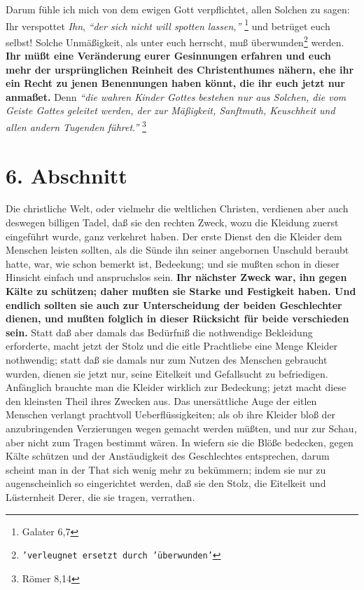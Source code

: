 \medskip

Darum fühle ich mich von dem ewigen Gott verpflichtet, allen Solchen zu sagen:
Ihr verspottet \textit{Ihn},
\textit{"`der sich nicht will spotten lassen,"'}
\footnote{Galater 6,7}
und betrüget euch selbst! Solche Unmäßigkeit, als unter euch herrscht, muß
überwunden\footnote{\texttt{'verleugnet ersetzt durch 'überwunden'}} werden.
\label{ref:14_06_wahre_nachfolger_umkehr}
\textbf{Ihr müßt eine Veränderung eurer Gesinnungen erfahren und euch
mehr der ursprünglichen Reinheit des Christenthumes nähern, ehe ihr ein Recht zu
jenen Benennungen haben könnt, die ihr euch jetzt nur anmaßet.}  Denn
\textit{"`die wahren
Kinder Gottes bestehen nur aus Solchen, die vom Geiste Gottes geleitet werden,
der zur Mäßigkeit, Sanftmuth, Keuschheit und allen andern Tugenden
führet."'}
\footnote{Römer 8,14}

\section{6. Abschnitt} \label{kap14_ab6}

Die christliche Welt, oder vielmehr die weltlichen Christen, verdienen aber auch
deswegen billigen Tadel, daß sie den rechten Zweck, wozu die Kleidung zuerst
eingeführt wurde, ganz verkehret haben. Der erste Dienst den die Kleider dem
Menschen leisten sollten, als die Sünde ihn seiner angebornen Unschuld beraubt
hatte, war, wie schon bemerkt ist, Bedeekung; und sie mußten schon in dieser
Hinsicht einfach und anspruchslos sein. \textbf{Ihr nächster Zweck war, ihn gegen Kälte
zu schützen; daher mußten sie Starke und Festigkeit haben. Und endlich sollten
sie auch zur Unterscheidung der beiden Geschlechter dienen, und mußten folglich
in dieser Rücksicht für beide verschieden sein.} Statt daß aber damals das
Bedürfniß die nothwendige Bekleidung erforderte, macht jetzt der Stolz und die
eitle Prachtliebe eine Menge Kleider nothwendig; statt daß sie damals nur zum
Nutzen des Menschen gebraucht wurden, dienen sie jetzt nur, seine Eitelkeit und
Gefallsucht zu befriedigen. Anfänglich brauchte man die Kleider wirklich zur
Bedeckung; jetzt macht diese den kleinsten Theil ihres Zwecken aus. Das
unersättliche Auge der eitlen Menschen verlangt prachtvoll Ueberflüssigkeiten;
als ob ihre Kleider bloß der anzubringenden Verzierungen wegen gemacht werden
müßten, und nur zur Schau, aber nicht zum Tragen bestimmt wären. In wiefern sie
die Blöße bedecken, gegen Kälte schützen und der Anstäudigkeit des Geschlechtes
entsprechen, darum scheint man in der That sich wenig mehr zu bekümmern; indem
sie nur zu augenscheinlich so eingerichtet werden, daß sie den Stolz, die
Eitelkeit und Lüsternheit Derer, die sie tragen, verrathen.


